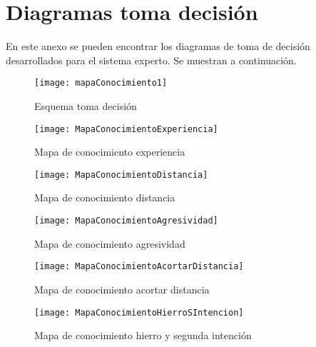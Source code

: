 \chapter{Diagramas toma decisión}
\label{cap:Diagramas toma decisión}

En este anexo se pueden encontrar los diagramas de toma de decisión desarrollados para el sistema
experto. Se muestran a continuación.

\begin{figure}[htb]
  \centering
    \texttt{[image: mapaConocimiento1]}
  \caption[Esquema toma decisión]{Esquema toma decisión}
  \label{fig:Esquema toma decisión}
\end{figure}

\begin{figure}[htb]
  \centering
    \texttt{[image: MapaConocimientoExperiencia]}
  \caption[Mapa de conocimiento experiencia]{Mapa de conocimiento experiencia}
  \label{fig:Arbol decisión experiencia}
\end{figure}

\begin{figure}[htb]
  \centering
    \texttt{[image: MapaConocimientoDistancia]}
  \caption[Mapa de conocimiento distancia]{Mapa de conocimiento distancia}
  \label{fig:Arbol decisión distancia}
\end{figure}


\begin{figure}[htb]
  \centering
    \texttt{[image: MapaConocimientoAgresividad]}
  \caption[Mapa de conocimiento agresividad]{Mapa de conocimiento agresividad}
  \label{fig:Arbol decisión agresividad}
\end{figure}


\begin{figure}[htb]
  \centering
    \texttt{[image: MapaConocimientoAcortarDistancia]}
  \caption[Mapa de conocimiento acortar distancia]{Mapa de conocimiento acortar distancia}
  \label{fig:Arbol decisión acortar distancia}
\end{figure}


\begin{figure}[htb]
  \centering
    \texttt{[image: MapaConocimientoHierroSIntencion]}
  \caption[Mapa de conocimiento hierro y segunda intención]{Mapa de conocimiento hierro y segunda intención}
  \label{fig:Arbol decisión hierro y segunda intención}
\end{figure}
